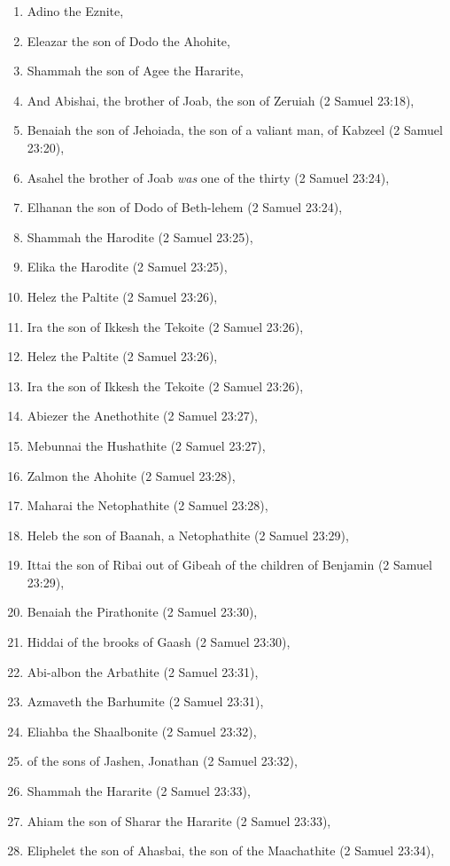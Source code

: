 \begin{enumerate}
\item Adino the Eznite,
\item Eleazar the son of Dodo the Ahohite,
\item Shammah the son of Agee the Hararite,
\item And Abishai, the brother of Joab, the son of Zeruiah (2 Samuel 23:18),
\item Benaiah the son of Jehoiada, the son of a valiant man, of Kabzeel (2 Samuel 23:20),
\item Asahel the brother of Joab \emph{was} one of the thirty (2 Samuel 23:24),
\item Elhanan the son of Dodo of Beth-lehem (2 Samuel 23:24),
\item Shammah the Harodite (2 Samuel 23:25),
\item Elika the Harodite (2 Samuel 23:25),
\item Helez the Paltite (2 Samuel 23:26),
\item Ira the son of Ikkesh the Tekoite (2 Samuel 23:26),
\item Helez the Paltite (2 Samuel 23:26),
\item Ira the son of Ikkesh the Tekoite (2 Samuel 23:26),
\item Abiezer the Anethothite (2 Samuel 23:27),
\item Mebunnai the Hushathite (2 Samuel 23:27),
\item Zalmon the Ahohite (2 Samuel 23:28),
\item Maharai the Netophathite (2 Samuel 23:28),
\item Heleb the son of Baanah, a Netophathite (2 Samuel 23:29),
\item Ittai the son of Ribai out of Gibeah of the children of Benjamin (2 Samuel 23:29),
\item Benaiah the Pirathonite (2 Samuel 23:30), 
\item Hiddai of the brooks of Gaash (2 Samuel 23:30),
\item Abi-albon the Arbathite (2 Samuel 23:31), 
\item Azmaveth the Barhumite (2 Samuel 23:31),
\item Eliahba the Shaalbonite (2 Samuel 23:32), 
\item of the sons of Jashen, Jonathan (2 Samuel 23:32),
\item Shammah the Hararite (2 Samuel 23:33), 
\item Ahiam the son of Sharar the Hararite (2 Samuel 23:33),
\item Eliphelet the son of Ahasbai, the son of the Maachathite (2 Samuel 23:34), 

\end{enumerate}
